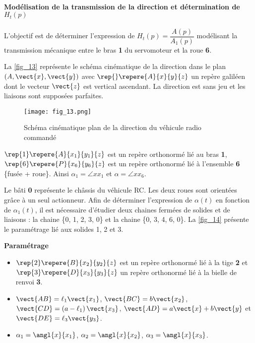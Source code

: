 \paragraph{Modélisation de la transmission de la direction et détermination de $H_t(p)$}

\begin{obj}
L’objectif est de déterminer l’expression de $H_t(p)=\dfrac{A(p)}{A_1(p)}$ 
modélisant la transmission mécanique entre le bras \textbf{1} du servomoteur et la roue \textbf{6}.
\end{obj}

La \autoref{fig_13} représente le schéma cinématique de la direction dans le plan $\left(A,\vect{x},\vect{y}\right)$ avec $\rep{}\repere{A}{x}{y}{z}$ un repère
galiléen dont le vecteur $\vect{z}$ est vertical ascendant. La direction est sans jeu et les liaisons sont supposées parfaites.

\begin{figure}[H]
\centering
\texttt{[image: fig\_13.png]}
\caption{Schéma cinématique plan de la direction du véhicule radio commandé \label{fig_13}}
\end{figure}


$\rep{1}\repere{A}{x_1}{y_1}{z}$  est un repère orthonormé lié au bras \textbf{1},
$\rep{6}\repere{P}{x_6}{y_6}{z}$  est un repère orthonormé lié à l’ensemble \textbf{6} \{fusée + roue\}.
 Ainsi $\alpha_1 = \angle{x}{x_1}$ et $\alpha = \angle{x}{x_6}$.

Le bâti \textbf{0} représente le châssis du véhicule RC. Les deux roues sont orientées grâce à un seul actionneur.
Afin de déterminer l’expression de $\alpha(t)$ en fonction de $\alpha_1(t)$, il est nécessaire d’étudier deux chaines fermées de
solides et de liaisons : la chaine \{0, 1, 2, 3, 0\} et la chaine \{0, 3, 4, 6, 0\}.
La \autoref{fig_14} présente le paramétrage lié aux solides 1, 2 et 3.

\textbf{Paramétrage}
\begin{itemize}
\item $\rep{2}\repere{B}{x_2}{y_2}{z}$ est un repère orthonormé lié à la tige \textbf{2} et 
$\rep{3}\repere{D}{x_3}{y_3}{z}$ un repère orthonormé lié à la
bielle de renvoi \textbf{3}.
\item $\vect{AB}=\ell_1\vect{x_1}$, $\vect{BC}=b\vect{x_2}$, $\vect{CD}=\left(a-\ell_1\right)\vect{x_3}$, $\vect{AD}=a\vect{x}+b\vect{y}$ et $\vect{DE}=\ell_3\vect{y_3}$.
\item $\alpha_1=\angl{x}{x_1}$, $\alpha_2=\angl{x}{x_2}$, $\alpha_3=\angl{x}{x_3}$.
\end{itemize}

